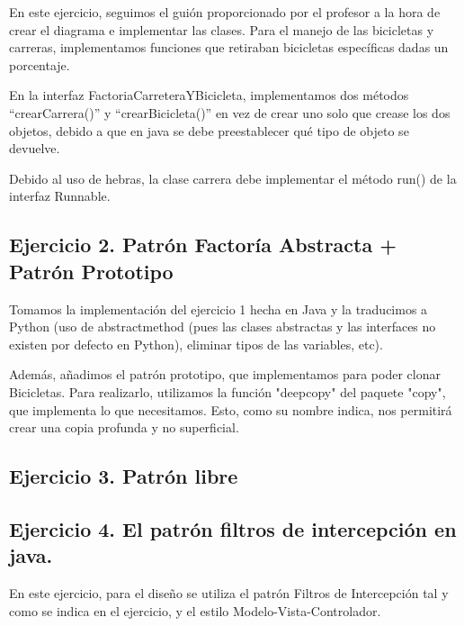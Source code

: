 \documentclass[
]{article}
\begin{document}
En este ejercicio, seguimos el guión proporcionado por el profesor a la
hora de crear el diagrama e implementar las clases. Para el manejo de
las bicicletas y carreras, implementamos funciones que retiraban
bicicletas específicas dadas un porcentaje.

En la interfaz FactoriaCarreteraYBicicleta, implementamos dos métodos
``crearCarrera()'' y ``crearBicicleta()'' en vez de crear uno solo que
crease los dos objetos, debido a que en java se debe preestablecer qué
tipo de objeto se devuelve.

Debido al uso de hebras, la clase carrera debe implementar el método
run() de la interfaz Runnable.

\subsection{\texorpdfstring{\textbf{Ejercicio 2. Patrón Factoría
Abstracta + Patrón
Prototipo}}{Ejercicio 2. Patrón Factoría Abstracta + Patrón Prototipo}}\label{ejercicio-2.-patruxf3n-factoruxeda-abstracta-patruxf3n-prototipo}

Tomamos la implementación del ejercicio 1 hecha en Java y la traducimos
a Python (uso de abstractmethod (pues las clases abstractas y las
interfaces no existen por defecto en Python), eliminar tipos de las
variables, etc).

Además, añadimos el patrón prototipo, que implementamos para poder
clonar Bicicletas. Para realizarlo, utilizamos la función "deepcopy" del
paquete "copy", que implementa lo que necesitamos. Esto, como su nombre
indica, nos permitirá crear una copia profunda y no superficial.

\subsection{\texorpdfstring{\textbf{Ejercicio 3}. \textbf{Patrón
libre}}{Ejercicio 3. Patrón libre}}\label{ejercicio-3.-patruxf3n-libre}

\subsection{\texorpdfstring{\textbf{Ejercicio 4. El patrón filtros de
intercepción en
java.}}{Ejercicio 4. El patrón filtros de intercepción en java.}}\label{ejercicio-4.-el-patruxf3n-filtros-de-intercepciuxf3n-en-java.}

En este ejercicio, para el diseño se utiliza el patrón Filtros de
Intercepción tal y como se indica en el ejercicio, y el estilo
Modelo-Vista-Controlador.
\end{document}
